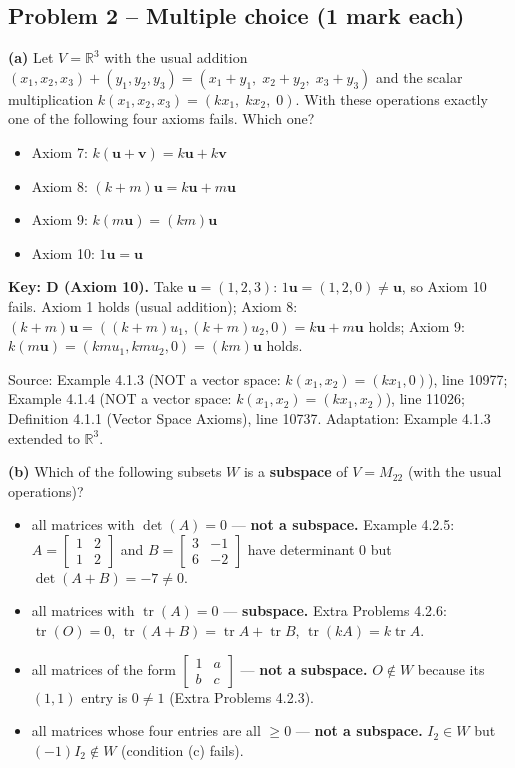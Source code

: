 \documentclass[11pt,a4paper]{article}
\newcommand{\Src}[1]{{\footnotesize\color{black!65}Source: #1}}
\begin{document}
\subsection*{Problem 2 -- Multiple choice (1 mark each)}
\textbf{(a)} Let $V=\mathbb{R}^3$ with the usual addition $(x_1,x_2,x_3)+(y_1,y_2,y_3)=(x_1+y_1,\;x_2+y_2,\;x_3+y_3)$ and the scalar multiplication $k(x_1,x_2,x_3)=(kx_1,\;kx_2,\;0)$. With these operations exactly one of the following four axioms fails. Which one?\par
\begin{itemize}[leftmargin=8mm,itemsep=0pt]\item[A] Axiom 7: $k(\mathbf{u}+\mathbf{v})=k\mathbf{u}+k\mathbf{v}$\item[B] Axiom 8: $(k+m)\mathbf{u}=k\mathbf{u}+m\mathbf{u}$\item[C] Axiom 9: $k(m\mathbf{u})=(km)\mathbf{u}$\item[D$^{\ast}$] Axiom 10: $1\mathbf{u}=\mathbf{u}$\end{itemize}
\textbf{Key: D (Axiom 10).} Take $\mathbf{u}=(1,2,3)$: $1\mathbf{u}=(1,2,0)\neq\mathbf{u}$, so Axiom 10 fails. Axiom 1 holds (usual addition); Axiom 8: $(k+m)\mathbf{u}=((k+m)u_1,(k+m)u_2,0)=k\mathbf{u}+m\mathbf{u}$ holds; Axiom 9: $k(m\mathbf{u})=(kmu_1,kmu_2,0)=(km)\mathbf{u}$ holds.\par
\Src{Example 4.1.3 (NOT a vector space: $k(x_1,x_2)=(kx_1,0)$), line 10977; Example 4.1.4 (NOT a vector space: $k(x_1,x_2)=(kx_1,x_2)$), line 11026; Definition 4.1.1 (Vector Space Axioms), line 10737. Adaptation: Example 4.1.3 extended to $\mathbb{R}^3$.}\par
{}\textbf{(b)} Which of the following subsets $W$ is a \textbf{subspace} of $V=M_{22}$ (with the usual operations)?\par
\begin{itemize}[leftmargin=8mm,itemsep=0pt]\item[A] all matrices with $\det(A)=0$ --- \textbf{not a subspace.} Example 4.2.5: $A=\begin{bmatrix}1&2\\1&2\end{bmatrix}$ and $B=\begin{bmatrix}3&-1\\6&-2\end{bmatrix}$ have determinant $0$ but $\det(A+B)=-7\neq0$.\item[B$^{\ast}$] all matrices with $\operatorname{tr}(A)=0$ --- \textbf{subspace.} Extra Problems 4.2.6: $\operatorname{tr}(O)=0$, $\operatorname{tr}(A+B)=\operatorname{tr}A+\operatorname{tr}B$, $\operatorname{tr}(kA)=k\operatorname{tr}A$.\item[C] all matrices of the form $\begin{bmatrix}1&a\\ b&c\end{bmatrix}$ --- \textbf{not a subspace.} $O\notin W$ because its $(1,1)$ entry is $0\neq1$ (Extra Problems 4.2.3).\item[D] all matrices whose four entries are all $\ge0$ --- \textbf{not a subspace.} $I_2\in W$ but $(-1)I_2\notin W$ (condition (c) fails).\end{itemize}
\end{document}
